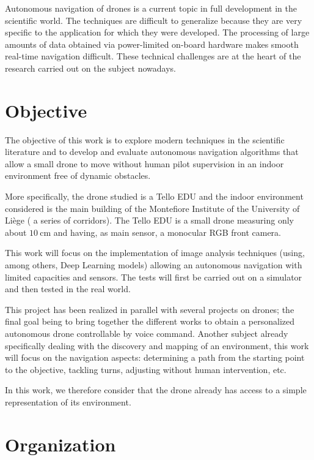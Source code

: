 Autonomous navigation of drones is a current topic in full development in the scientific world. The techniques are difficult to generalize because they are very specific to the application for which they were developed. The processing of large amounts of data obtained via power-limited on-board hardware makes smooth real-time navigation difficult. These technical challenges are at the heart of the research carried out on the subject nowadays.

\section{Objective}

The objective of this work is to explore modern techniques in the scientific literature and to develop and evaluate autonomous navigation algorithms that allow a small drone to move without human pilot supervision in an indoor environment free of dynamic obstacles.

More specifically, the drone studied is a Tello EDU and the indoor environment considered is the main building of the Montefiore Institute of the University of Liège (\ie{} a series of corridors). The Tello EDU is a small drone measuring only about $\SI{10}{\centi\meter}$ and having, as main sensor, a monocular RGB front camera.

This work will focus on the implementation of image analysis techniques (using, among others, Deep Learning models) allowing an autonomous navigation with limited capacities and sensors. The tests will first be carried out on a simulator and then tested in the real world.

\begin{note}
    This project has been realized in parallel with several projects on drones; the final goal being to bring together the different works to obtain a personalized autonomous drone controllable by voice command. Another subject already specifically dealing with the discovery and mapping of an environment, this work will focus on the navigation aspects: determining a path from the starting point to the objective, tackling turns, adjusting without human intervention, etc.

    In this work, we therefore consider that the drone already has access to a simple representation of its environment.
\end{note}

\section{Organization}

